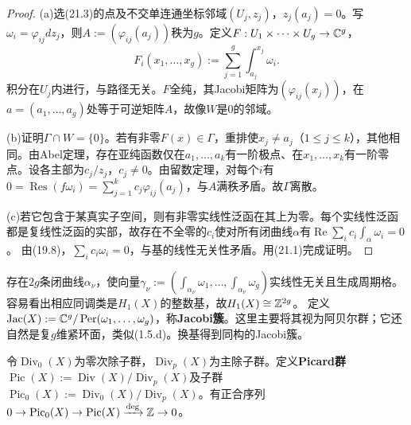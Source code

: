 \begin{proof}
(a)选(21.3)的点及不交单连通坐标邻域$(U_j,z_j)$，$z_j(a_j)=0$。写$\omega_i=\varphi_{ij}dz_j$，则$A:=(\varphi_{ij}(a_j))$秩为$g$。定义$F:U_1\times\cdots\times U_g\to\mathbb C^g$，
\[
F_i(x_1,\ldots,x_g):=\sum_{j=1}^g\int_{a_j}^{x_j}\omega_i.
\]
积分在$U_j$内进行，与路径无关。$F$全纯，其Jacobi矩阵为$(\varphi_{ij}(x_j))$，在$a=(a_1,\ldots,a_g)$处等于可逆矩阵$A$，故像$W$是0的邻域。

(b)证明$\Gamma\cap W=\{0\}$。若有非零$F(x)\in\Gamma$，重排使$x_j\ne a_j$（$1\le j\le k$），其他相同。由Abel定理，存在亚纯函数仅在$a_1,\ldots,a_k$有一阶极点、在$x_1,\ldots,x_k$有一阶零点。设各主部为$c_j/z_j$，$c_j\ne0$。由留数定理，对每个$i$有$0=\operatorname{Res}(f\omega_i)=\sum_{j=1}^kc_j\varphi_{ij}(a_j)$，与$A$满秩矛盾。故$\Gamma$离散。

(c)若它包含于某真实子空间，则有非零实线性泛函在其上为零。每个实线性泛函都是复线性泛函的实部，故存在不全零的$c_i$使对所有闭曲线$\alpha$有$\operatorname{Re}\sum_i c_i\int_\alpha\omega_i=0$。
由(19.8)，$\sum_ic_i\omega_i=0$，与基的线性无关性矛盾。用(21.1)完成证明。
\end{proof}
存在$2g$条闭曲线$\alpha_\nu$，使向量$\gamma_\nu:=(\int_{\alpha_\nu}\omega_1,\ldots,\int_{\alpha_\nu}\omega_g)$实线性无关且生成周期格。容易看出相应同调类是$H_1(X)$的整数基，故$H_1(X)\cong\mathbb Z^{2g}$。
定义$\operatorname{Jac}(X):=\mathbb C^g/\operatorname{Per}(\omega_1,\ldots,\omega_g)$，称\textbf{Jacobi簇}。这里主要将其视为阿贝尔群；它还自然是复$g$维紧环面，类似(1.5.d)。换基得到同构的Jacobi簇。

令$\operatorname{Div}_0(X)$为零次除子群，$\operatorname{Div}_p(X)$为主除子群。定义\textbf{Picard群}$\operatorname{Pic}(X):=\operatorname{Div}(X)/\operatorname{Div}_p(X)$及子群$\operatorname{Pic}_0(X):=\operatorname{Div}_0(X)/\operatorname{Div}_p(X)$。有正合序列$0\to\operatorname{Pic}_0(X)\to\operatorname{Pic}(X)\xrightarrow{\deg}\mathbb Z\to0$。


